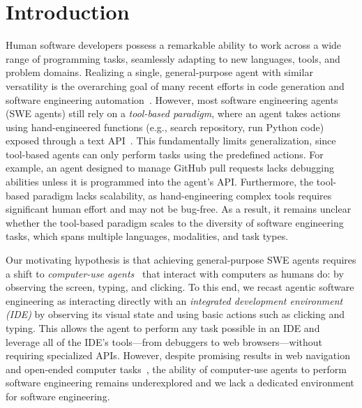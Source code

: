 \section{Introduction}
\label{sect:intro}


Human software developers possess a remarkable ability to work across a wide range of programming tasks, seamlessly adapting to new languages, tools, and problem domains. 
Realizing a single, general-purpose agent with similar versatility is the overarching goal of many recent efforts in code generation and software engineering automation~\cite{Jiang2024ASO,Jin2024FromLT,wang2024openhandsopenplatformai}. 
However, most software engineering agents (SWE agents) still rely on a \textit{tool-based paradigm},
where an agent takes actions using hand-engineered functions (e.g., search repository, run Python code) exposed through a text API~\cite{yang2024sweagentagentcomputerinterfacesenable,yang2024swebenchmultimodalaisystems,wang2024executablecodeactionselicit,wang2024openhandsopenplatformai}.
This fundamentally limits generalization, since tool-based agents can only perform tasks using the predefined actions.
For example, an agent designed to manage GitHub pull requests lacks debugging abilities unless it is programmed into the agent's API.
Furthermore, the tool-based paradigm lacks scalability, as hand-engineering complex tools requires significant human effort and may not be bug-free.
As a result, it remains unclear whether the tool-based paradigm scales to the diversity of software engineering tasks, which spans multiple languages, modalities, and task types.

Our motivating hypothesis is that achieving general-purpose SWE agents requires a shift to \textit{computer-use agents}~\cite{anthropic2024developing} that interact with computers as humans do: by observing the screen, typing, and clicking. 
To this end, we recast agentic software engineering as interacting directly with an \textit{integrated development environment (IDE)} by observing its visual state and using basic actions such as clicking and typing.
This allows the agent to perform any task possible in an IDE and leverage all of the IDE's tools—from debuggers to web browsers—without requiring specialized APIs.
However, despite promising results in  web navigation~\cite{anthropic2024developing} and open-ended computer tasks~\cite{xie2024osworldbenchmarkingmultimodalagents}, the ability of computer-use agents to perform software engineering remains underexplored and we lack a dedicated environment for software engineering.



